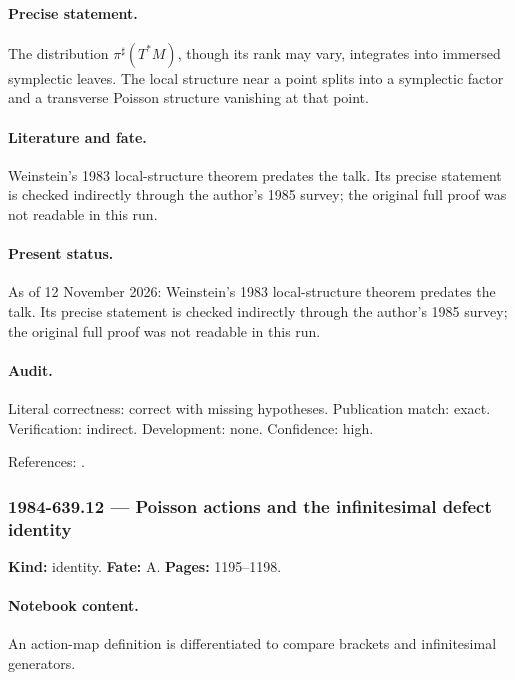 \paragraph{Precise statement.} The distribution \(\pi^\sharp(T^*M)\), though its rank may vary, integrates into immersed symplectic leaves. The local structure near a point splits into a symplectic factor and a transverse Poisson structure vanishing at that point.

\paragraph{Literature and fate.} Weinstein's 1983 local-structure theorem predates the talk. Its precise statement is checked indirectly through the author's 1985 survey; the original full proof was not readable in this run.

\paragraph{Present status.} As of 12 November 2026: Weinstein's 1983 local-structure theorem predates the talk. Its precise statement is checked indirectly through the author's 1985 survey; the original full proof was not readable in this run.

\paragraph{Audit.} Literal correctness: correct with missing hypotheses. Publication match: exact. Verification: indirect. Development: none. Confidence: high.

\noindent References: \citep{weinstein1983local,weinstein1985poisson}.\par

\subsubsection{1984-639.12 --- Poisson actions and the infinitesimal defect identity}

\label{item:1984-639.12}

\noindent\textbf{Kind:} identity. \textbf{Fate:} A. \textbf{Pages:} 1195--1198.\par

\paragraph{Notebook content.} An action-map definition is differentiated to compare brackets and infinitesimal generators.

